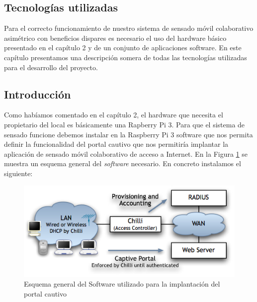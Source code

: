 \clearpage
{}%
\begin{center}
\begin{minipage}{.75\textwidth}
\section{Tecnologías utilizadas}

Para el correcto funcionamiento de nuestro sistema de sensado móvil colaborativo asimétrico con beneficios dispares es necesario el uso del hardware básico presentado en el capítulo 2 y de un conjunto de aplicaciones software. En este capítulo presentamos una descripción somera de todas las tecnologías utilizadas para el desarrollo del proyecto. %
\end{minipage}
\end{center}
\clearpage%

\subsection{Introducción}
Como habíamos comentado en el capítulo 2, el hardware que necesita el propietario del local es básicamente una Rapberry Pi 3. Para que el sistema de sensado funcione debemos instalar en la Raspberry Pi 3 software que nos permita definir la funcionalidad del portal cautivo que nos permitiría implantar la aplicación de sensado móvil colaborativo de acceso a Internet. En la Figura \ref{CoovaScheme} se muestra un esquema general del \emph{software} necesario. En concreto instalamos el siguiente:

\begin{figure}[!t]
\begin{center}
\includegraphics[width=0.75\linewidth]{./3_Tecnologias/Img/CoovaScheme.jpg}
\end{center}
\caption{Esquema general del Software utilizado para la implantación del portal cautivo}
\label{CoovaScheme}
\end{figure}


